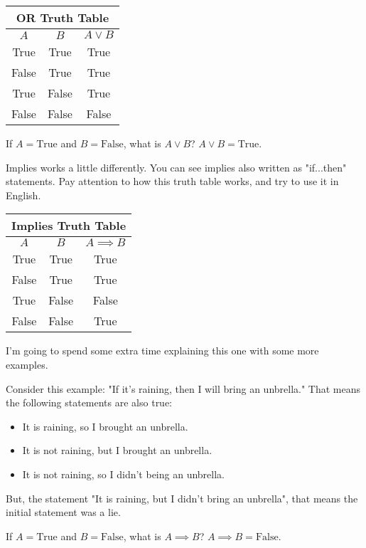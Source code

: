 \begin{tabular}{c|c|c}
	\hline
	\multicolumn{3}{c}{OR Truth Table}\\
	\hline
	$A$ & $B$ & $A \lor B$\\
	\hline
	True & True & True\\
	False & True & True\\
	True & False & True\\
	False & False & False\\
	\hline
\end{tabular}

\begin{boxexample}{}{}
	If $A=\text{True}$ and $B=\text{False}$, what is $A \lor B$? $A \lor B = \text{True}$.
\end{boxexample}

Implies works a little differently. You can see implies also written as "if...then" statements. Pay attention to how this truth table works, and try to use it in English.

\begin{tabular}{c|c|c}
	\hline
	\multicolumn{3}{c}{Implies Truth Table}\\
	\hline
	$A$ & $B$ & $A \implies B$\\
	\hline
	True & True & True\\
	False & True & True\\
	True & False & False\\
	False & False & True\\
	\hline
\end{tabular}

I'm going to spend some extra time explaining this one with some more examples.

\begin{boxexample}{}{}
	Consider this example: "If it's raining, then I will bring an unbrella." That means the following statements are also true:
	\begin{itemize}
		\item It is raining, so I brought an unbrella.
		\item It is not raining, but I brought an unbrella.
		\item It is not raining, so I didn't being an unbrella.
	\end{itemize}
	But, the statement "It is raining, but I didn't bring an unbrella", that means the initial statement was a lie.
\end{boxexample}

\begin{boxexample}{}{}
	If $A=\text{True}$ and $B=\text{False}$, what is $A \implies B$? $A \implies B = \text{False}$.
\end{boxexample}

